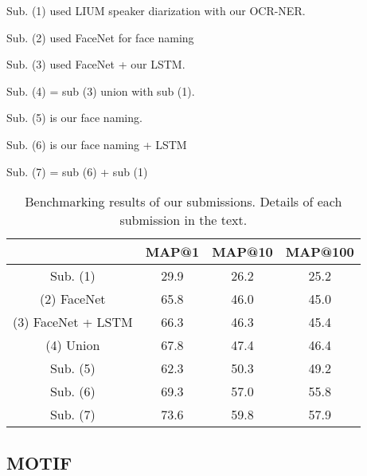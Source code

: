 \begin{compactitem}
  \item Sub. (1) used LIUM speaker diarization with our OCR-NER.
  \item Sub. (2) used FaceNet for face naming
	\item Sub. (3) used FaceNet + our LSTM.
	\item Sub. (4) = sub (3) union with sub (1).
	
	\item Sub. (5) is our face naming.
	\item Sub. (6) is our face naming + LSTM
	\item Sub. (7) = sub (6) + sub (1)
\end{compactitem}

\begin{table}[tb]
\centering
\begin{tabular}{c|c|c|c|}
\cline{2-4}
                                & MAP@1  & MAP@10 & MAP@100  \\ \hline
 \multicolumn{1}{|c|}{Sub. (1)} & 29.9   & 26.2   & 25.2 \\ \hline \hline
 \multicolumn{1}{|c|}{(2) FaceNet} & 65.8   & 46.0   & 45.0 \\ \hline
 \multicolumn{1}{|c|}{(3) FaceNet + LSTM} & 66.3   & 46.3   & 45.4 \\ \hline
 \multicolumn{1}{|c|}{(4) Union} & 67.8   & 47.4   & 46.4 \\ \hline
 \hline
 \multicolumn{1}{|c|}{Sub. (5)} & 62.3   & 50.3   & 49.2 \\ \hline
 \multicolumn{1}{|c|}{Sub. (6)} & 69.3   & 57.0   & 55.8 \\ \hline
 \multicolumn{1}{|c|}{Sub. (7)} & 73.6   & 59.8   & 57.9 \\ \hline

\end{tabular}
\vspace*{-2mm}
\caption{Benchmarking results of our submissions. Details of each submission in the text.}
\vspace*{-2mm}
\label{tab:mediaeval}
\end{table}

\subsection{MOTIF}

